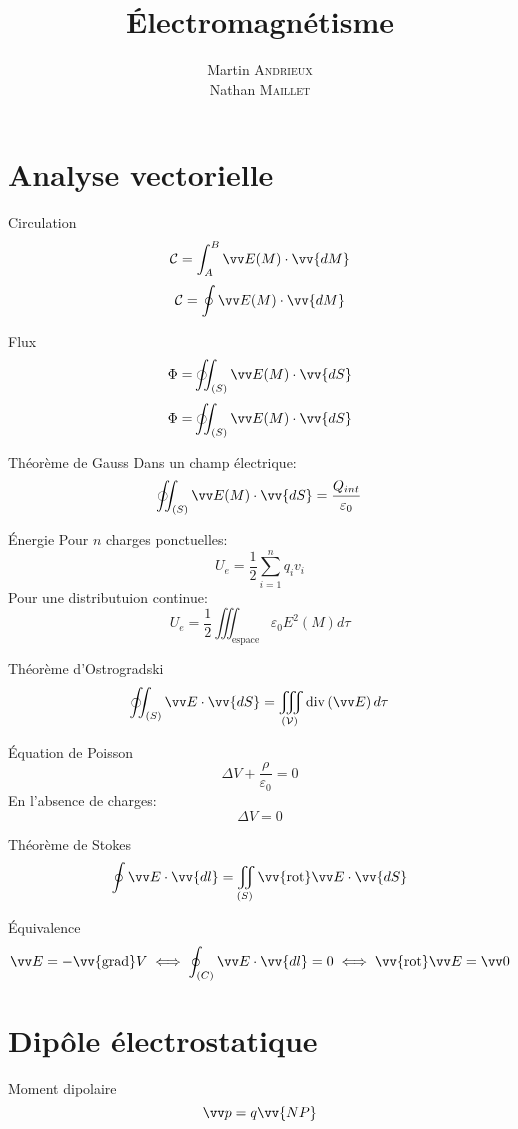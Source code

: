 \documentclass[french, a4paper, 11pt, twocolumn]{article}
\title{Électromagnétisme}
\author{Martin \textsc{Andrieux} \\ Nathan \textsc{Maillet}}
\date{}
\newcommand{\inv}[1]{\dfrac{1}{#1}}
\newcommand{\po}{\left(}         %
\newcommand{\pf}{\right)}        %
\newcommand{\vect}[1]{\vv{#1}}
\newcommand{\grad}{\vect{\mathrm{grad}}}  %
\DeclareMathOperator{\diverg}{div}        %
\newcommand{\rota}{\vv{\mathrm{rot}}}    %
\newcommand{\ooint}{\ocircle\hspace{-3.65mm}\int\hspace{-2mm}\int}
\begin{document}
\maketitle

\section{Analyse vectorielle}
\begin{cadre}{Circulation}
  \[\mathcal C = \int_A^B \vv E(M)\cdot\vv{d M}\]
  \[\mathcal C = \oint \vv E(M)\cdot\vv{d M}\]
\end{cadre}

\begin{cadre}{Flux}
  \[\Phi = \ooint_{(S)} \vv E(M)\cdot\vv{d S}\]
  \[\Phi = \ooint_{(S)} \vv E(M)\cdot\vv{d S}\]
\end{cadre}

\begin{cadre}{Théorème de Gauss}
  Dans un champ électrique:
  \[\ooint_{(S)}\vv E(M)\cdot\vv{d S} = \dfrac{Q_{int}}{\varepsilon_{0}}\]
\end{cadre}

\begin{cadre}{Énergie}
  Pour \(n\) charges ponctuelles:
  \[U_{e} = \dfrac{1}{2}\sum_{i=1}^n q_{i}v_{i}\]
  Pour une distributuion continue:
  \[U_{e} = \inv{2}\iiint_{\text{espace}}\varepsilon_{0} E^{2}(M) d\tau\]
\end{cadre}

\begin{cadre}{Théorème d'Ostrogradski}
  \[\ooint_{(S)}\vv E \cdot \vv{d S} = \iiint_{(\mathcal V)} \diverg\po\vv E\pf d\tau\]
\end{cadre}

\begin{cadre}{Équation de Poisson}
  \[\Delta V + \dfrac{\rho}{\varepsilon_{0}} = 0\]
  En l'absence de charges:
  \[\Delta V = 0\]
\end{cadre}

\begin{cadre}{Théorème de Stokes}
  \[\oint \vv E\cdot\vv{d l} = \iint_{(S)}\rota \vv E \cdot \vv{d S}\]
\end{cadre}

\begin{cadre}{Équivalence}
  \[\vv E = -\grad V \iff \oint_{(C)}\vv E\cdot \vv{d l} = 0 \iff \rota\vv E = \vv0\]
\end{cadre}

\section{Dipôle électrostatique}
\begin{cadre}{Moment dipolaire}
  \[\vv p = q \vv{NP}\]
\end{cadre}
\end{document}
